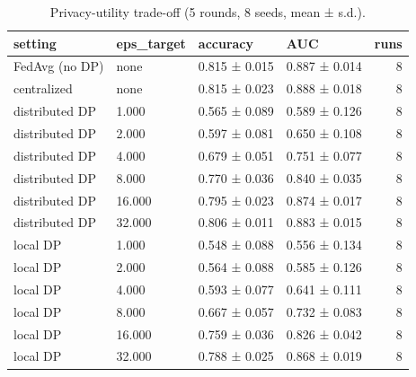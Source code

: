 \begin{table}
\caption{Privacy-utility trade-off (5 rounds, 8 seeds, mean ± s.d.).}
\label{tab:T01_privacy_utility}
\begin{tabular}{llllr}
\toprule
setting & eps\_target & accuracy & AUC & runs \\
\midrule
FedAvg (no DP) & none & 0.815 ± 0.015 & 0.887 ± 0.014 & 8 \\
centralized & none & 0.815 ± 0.023 & 0.888 ± 0.018 & 8 \\
distributed DP & 1.000 & 0.565 ± 0.089 & 0.589 ± 0.126 & 8 \\
distributed DP & 2.000 & 0.597 ± 0.081 & 0.650 ± 0.108 & 8 \\
distributed DP & 4.000 & 0.679 ± 0.051 & 0.751 ± 0.077 & 8 \\
distributed DP & 8.000 & 0.770 ± 0.036 & 0.840 ± 0.035 & 8 \\
distributed DP & 16.000 & 0.795 ± 0.023 & 0.874 ± 0.017 & 8 \\
distributed DP & 32.000 & 0.806 ± 0.011 & 0.883 ± 0.015 & 8 \\
local DP & 1.000 & 0.548 ± 0.088 & 0.556 ± 0.134 & 8 \\
local DP & 2.000 & 0.564 ± 0.088 & 0.585 ± 0.126 & 8 \\
local DP & 4.000 & 0.593 ± 0.077 & 0.641 ± 0.111 & 8 \\
local DP & 8.000 & 0.667 ± 0.057 & 0.732 ± 0.083 & 8 \\
local DP & 16.000 & 0.759 ± 0.036 & 0.826 ± 0.042 & 8 \\
local DP & 32.000 & 0.788 ± 0.025 & 0.868 ± 0.019 & 8 \\
\bottomrule
\end{tabular}
\end{table}
